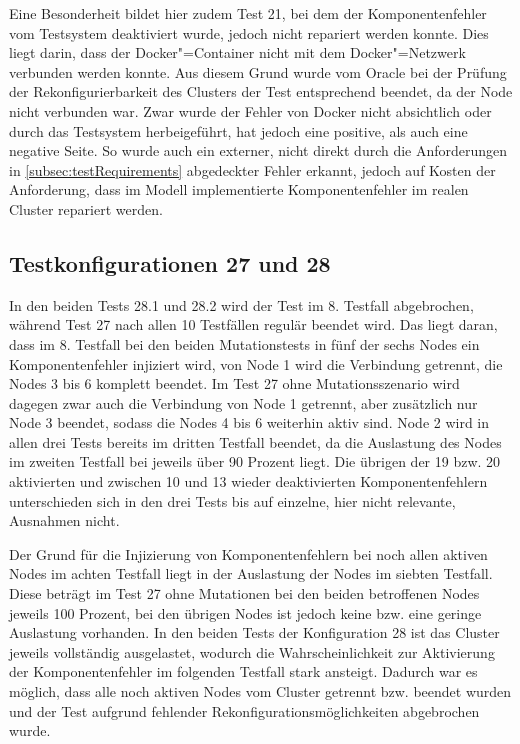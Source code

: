 Eine Besonderheit bildet hier zudem \gls{Test} 21, bei dem der Komponentenfehler vom Testsystem deaktiviert wurde, jedoch nicht repariert werden konnte.
Dies liegt darin, dass der Docker"=Container nicht mit dem Docker"=Netzwerk verbunden werden konnte.
Aus diesem Grund wurde vom Oracle bei der Prüfung der Rekonfigurierbarkeit des Clusters der \gls{Test} entsprechend beendet, da der Node nicht verbunden war.
Zwar wurde der Fehler von Docker nicht absichtlich oder durch das Testsystem herbeigeführt, hat jedoch eine positive, als auch eine negative Seite.
So wurde auch ein externer, nicht direkt durch die Anforderungen in \cref{subsec:testRequirements} abgedeckter Fehler erkannt, jedoch auf Kosten der Anforderung, dass im Modell implementierte Komponentenfehler im realen Cluster repariert werden.

\subsection{Testkonfigurationen 27 und 28}
\label{subsec:noReconf2728}

In den beiden \glspl{Test} 28.1 und 28.2 wird der \gls{Test} im 8. \gls{Testfall} abgebrochen, während \gls{Test} 27 nach allen 10 Testfällen regulär beendet wird.
Das liegt daran, dass im 8. \gls{Testfall} bei den beiden Mutationstests in fünf der sechs Nodes ein Komponentenfehler injiziert wird, von Node 1 wird die Verbindung getrennt, die Nodes 3 bis 6 komplett beendet.
Im \gls{Test} 27 ohne Mutationsszenario wird dagegen zwar auch die Verbindung von Node 1 getrennt, aber zusätzlich nur Node 3 beendet, sodass die Nodes 4 bis 6 weiterhin aktiv sind.
Node 2 wird in allen drei \glspl{Test} bereits im dritten \gls{Testfall} beendet, da die Auslastung des Nodes im zweiten \gls{Testfall} bei jeweils über 90 Prozent liegt.
Die übrigen der 19 bzw. 20 aktivierten und zwischen 10 und 13 wieder deaktivierten Komponentenfehlern unterschieden sich in den drei \glspl{Test} bis auf einzelne, hier nicht relevante, Ausnahmen nicht.

Der Grund für die Injizierung von Komponentenfehlern bei noch allen aktiven Nodes im achten \gls{Testfall} liegt in der Auslastung der Nodes im siebten Testfall.
Diese beträgt im \gls{Test} 27 ohne Mutationen bei den beiden betroffenen Nodes jeweils 100 Prozent, bei den übrigen Nodes ist jedoch keine bzw. eine geringe Auslastung vorhanden.
In den beiden \glspl{Test} der Konfiguration 28 ist das Cluster jeweils vollständig ausgelastet, wodurch die Wahrscheinlichkeit zur Aktivierung der Komponentenfehler im folgenden \gls{Testfall} stark ansteigt.
Dadurch war es möglich, dass alle noch aktiven Nodes vom Cluster getrennt bzw. beendet wurden und der \gls{Test} aufgrund fehlender Rekonfigurationsmöglichkeiten abgebrochen wurde.

